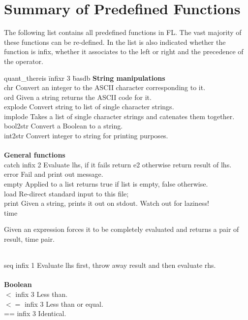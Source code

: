 \section{Summary of Predefined Functions}

The following list contains all predefined functions in FL.
The vast majority of these functions can be re-defined.
In the list is also indicated whether the function is infix, whether it
associates to the left or right and the precedence of the operator.

\begin{tabbing}
quant\_thereis \=infixr 3     \=basdb \kill
{\bf String manipulations}\\
chr         \>\>Convert an integer to the ASCII character corresponding to it.\\
ord         \>\>Given a string returns the ASCII code for it.\\
explode     \>\>Convert string to list of single character strings.\\
implode     \>\>Takes a list of single character strings and catenates them together.\\
bool2str    \>\>Convert a Boolean to a string.\\
int2str     \>\>Convert integer to string for printing purposes.\\
\\
{\bf General functions} \\
catch \>infix 2  \>Evaluate lhs, if it fails return e2 otherwise return result of lhs.\\
error       \>\>Fail and print out message.\\
empty       \>\>Applied to a list returns true if list is empty, false otherwise.\\
load        \>\>Re-direct standard input to this file;\\
print       \>\>Given a string, prints it out on stdout. Watch out for laziness!\\
time        \>\>\parbox[t]{4.5in}{Given an expression forces it to be completely evaluated and returns a pair of result, time pair.}\\
seq \>infix 1 \>Evaluate lhs first, throw away result and then evaluate rhs.\\
\\
{\bf Boolean}\\
$<$       \>infix 3 \>Less than.\\
$<=$      \>infix 3 \>Less than or equal.\\
==      \>infix 3 \>Identical.\\

\end{tabbing}
